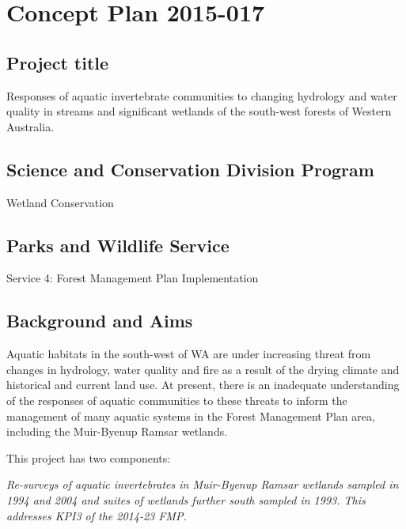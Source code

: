 \documentclass[version=last, paper=a4, DIV=18, usenames, dvipsnames]{scrartcl}
\begin{document}
%

%



\section*{Concept Plan 2015-017}

\subsection*{Project title}
Responses of aquatic invertebrate communities to changing hydrology and
water quality in streams and significant wetlands of the south-west
forests of Western Australia.



\subsection*{Science and Conservation Division Program}
Wetland Conservation



\subsection*{Parks and Wildlife Service}
Service 4: Forest Management Plan Implementation



\subsection*{Background and Aims}
Aquatic habitats in the south-west of WA are under increasing threat
from changes in hydrology, water quality and fire as a result of the
drying climate and historical and current land use. At present, there is
an inadequate understanding of the responses of aquatic communities to
these threats to inform the management of many aquatic systems in the
Forest Management Plan area, including the Muir-Byenup Ramsar wetlands.

This project has two components:

\emph{Re-surveys of aquatic invertebrates in Muir-Byenup Ramsar wetlands
sampled in 1994 and 2004 and suites of wetlands further south sampled in
1993. This addresses KPI3 of the 2014-23 FMP.}
\end{document}
